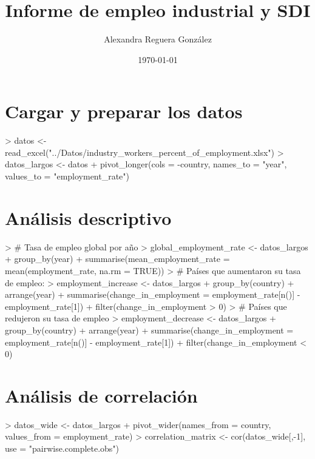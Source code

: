\documentclass{article}
\begin{document}


\title{Informe de empleo industrial y SDI}
\author{Alexandra Reguera González}
\date{\today}
\maketitle

\section{Cargar y preparar los datos}

\begin{Schunk}
\begin{Sinput}
> datos <- read_excel("../Datos/industry_workers_percent_of_employment.xlsx")
> datos_largos <- datos %>%
+   pivot_longer(cols = -country, names_to = "year", values_to = "employment_rate")
\end{Sinput}
\end{Schunk}

\section{Análisis descriptivo}

\begin{Schunk}
\begin{Sinput}
> # Tasa de empleo global por año
> global_employment_rate <- datos_largos %>%
+   group_by(year) %>%
+   summarise(mean_employment_rate = mean(employment_rate, na.rm = TRUE))
> # Países que aumentaron su tasa de empleo:
> employment_increase <- datos_largos %>%
+   group_by(country) %>%
+   arrange(year) %>%
+   summarise(change_in_employment = employment_rate[n()] - employment_rate[1]) %>%
+   filter(change_in_employment > 0)
> # Países que redujeron su tasa de empleo
> employment_decrease <- datos_largos %>%
+   group_by(country) %>%
+   arrange(year) %>%
+   summarise(change_in_employment = employment_rate[n()] - employment_rate[1]) %>%
+   filter(change_in_employment < 0)
\end{Sinput}
\end{Schunk}

\section{Análisis de correlación}

\begin{Schunk}
\begin{Sinput}
> datos_wide <- datos_largos %>%
+   pivot_wider(names_from = country, values_from = employment_rate)
> correlation_matrix <- cor(datos_wide[,-1], use = "pairwise.complete.obs")
\end{Sinput}
\end{Schunk}
\end{document}
